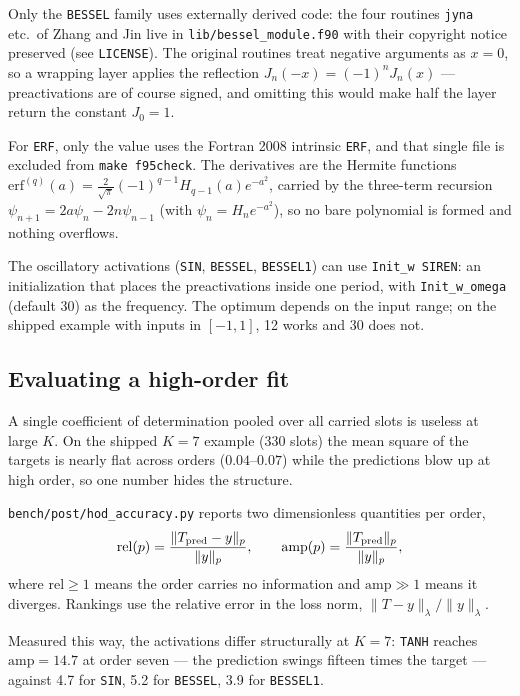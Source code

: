 \documentclass[10pt,a4paper]{article}
\newcommand{\code}[1]{\texttt{#1}}
\begin{document}
Only the \code{BESSEL} family uses externally derived code: the four
routines \code{jyna} etc.\ of Zhang and Jin live in
\code{lib/bessel\_module.f90} with their copyright notice preserved
(see \code{LICENSE}). The original routines treat negative arguments
as $x=0$, so a wrapping layer applies the reflection
$J_n(-x)=(-1)^nJ_n(x)$ --- preactivations are of course signed, and
omitting this would make half the layer return the constant $J_0=1$.

For \code{ERF}, only the value uses the Fortran 2008 intrinsic
\code{ERF}, and that single file is excluded from
\code{make f95check}. The derivatives are the Hermite functions
$\mathrm{erf}^{(q)}(a)=\frac{2}{\sqrt\pi}(-1)^{q-1}H_{q-1}(a)e^{-a^2}$,
carried by the three-term recursion $\psi_{n+1}=2a\psi_n-2n\psi_{n-1}$
(with $\psi_n=H_ne^{-a^2}$), so no bare polynomial is formed and
nothing overflows.

The oscillatory activations (\code{SIN}, \code{BESSEL},
\code{BESSEL1}) can use \code{Init\_w SIREN}: an initialization that
places the preactivations inside one period, with
\code{Init\_w\_omega} (default 30) as the frequency. The optimum
depends on the input range; on the shipped example with inputs in
$[-1,1]$, 12 works and 30 does not.

\subsection{Evaluating a high-order fit}
\label{sec:hodmetric}

A single coefficient of determination pooled over all carried slots
is useless at large $K$. On the shipped $K=7$ example (330 slots) the
mean square of the targets is nearly flat across orders
($0.04$--$0.07$) while the predictions blow up at high order, so one
number hides the structure.

\code{bench/post/hod\_accuracy.py} reports two dimensionless
quantities per order,
\[
\mathrm{rel}(p)=\frac{\|T_{\rm pred}-y\|_p}{\|y\|_p},\qquad
\mathrm{amp}(p)=\frac{\|T_{\rm pred}\|_p}{\|y\|_p},
\]
where $\mathrm{rel}\ge1$ means the order carries no information and
$\mathrm{amp}\gg1$ means it diverges. Rankings use the relative error
in the loss norm, $\|T-y\|_\lambda/\|y\|_\lambda$.

Measured this way, the activations differ structurally at $K=7$:
\code{TANH} reaches $\mathrm{amp}=14.7$ at order seven --- the
prediction swings fifteen times the target --- against 4.7 for
\code{SIN}, 5.2 for \code{BESSEL}, 3.9 for \code{BESSEL1}.
\end{document}
